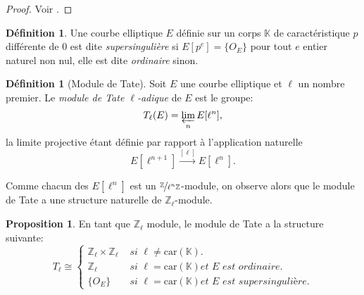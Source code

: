 \documentclass[10pt,a4paper]{book}
\theoremstyle{plain}
\theoremstyle{definition}
\theoremstyle{definition}
\theoremstyle{definition}
\newtheorem{prop}[thm]{Proposition}
\theoremstyle{definition}
\newtheorem{defi}[thm]{Définition}
\theoremstyle{remark}
\theoremstyle{remark}
\begin{document}
\begin{proof}
Voir \cite[Corrolary III.6.4]{Silv1}.
\end{proof}

\begin{defi}
Une courbe elliptique $E$ définie sur un corps $\mathbb{K}$ de caractéristique $p$ différente de $0$ est dite \emph{supersingulière} si $E[p^e]=\{O_E\}$ pour tout $e$ entier naturel non nul, elle est dite \emph{ordinaire} sinon. 
\end{defi}

\begin{defi}[Module de Tate]
Soit $E$ une courbe elliptique et $\ell$ un nombre premier. Le \emph{module de Tate $\ell$-adique} de $E$ est le groupe:
\begin{equation*}
T_{\ell}(E)=\varprojlim_nE[\ell^n],
\end{equation*}
la limite projective étant définie par rapport à l'application naturelle
\begin{equation*}
E[\ell^{n+1}] \overset{[\ell]}{\rightarrow} E[\ell^n].
\end{equation*}
\end{defi}
Comme chacun des $E[\ell^n]$ est un $\nicefrac{\mathbb{Z}}{\ell^n\mathbb{Z}}$-module, on observe alors que le module de Tate a une structure naturelle de $\mathbb{Z}_{\ell}$-module.
\begin{prop}
En tant que $\mathbb{Z}_{\ell}$ module, le module de Tate a la structure suivante:
\begin{equation*}
T_{\ell} \cong 
\begin{cases} 
\mathbb{Z}_{\ell} \times \mathbb{Z}_{\ell} &\textit{ si } \ell \neq \mathrm{car}(\mathbb{K}). \\
\mathbb{Z}_{\ell} &\textit{ si } \ell=\mathrm{car}(\mathbb{K})  \textit{et E est ordinaire}. \\
\{O_E\} &\textit{ si } \ell=\mathrm{car}(\mathbb{K})  \textit{et E est supersingulière}.
\end{cases}
\end{equation*}
\end{prop}

\end{document}
